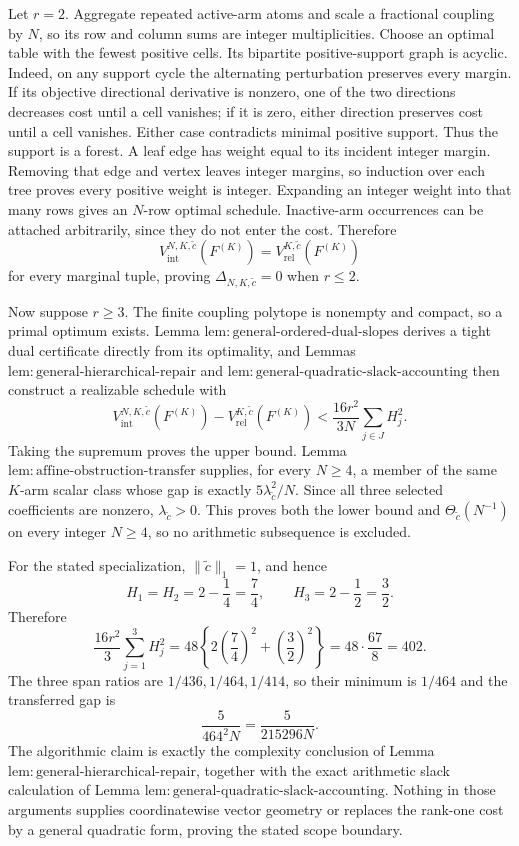 Let \(r=2\).  Aggregate repeated active-arm atoms and scale a fractional coupling by \(N\), so its row and column sums are integer multiplicities.  Choose an optimal table with the fewest positive cells.  Its bipartite positive-support graph is acyclic.  Indeed, on any support cycle the alternating perturbation preserves every margin.  If its objective directional derivative is nonzero, one of the two directions decreases cost until a cell vanishes; if it is zero, either direction preserves cost until a cell vanishes.  Either case contradicts minimal positive support.  Thus the support is a forest.  A leaf edge has weight equal to its incident integer margin.  Removing that edge and vertex leaves integer margins, so induction over each tree proves every positive weight is integer.  Expanding an integer weight into that many rows gives an \(N\)-row optimal schedule.  Inactive-arm occurrences can be attached arbitrarily, since they do not enter the cost.  Therefore
\[
 V_{\mathrm{int}}^{N,K,\widetilde c}(F^{(K)})
 =V_{\mathrm{rel}}^{K,\widetilde c}(F^{(K)})
\]
for every marginal tuple, proving \(\Delta_{N,K,\widetilde c}=0\) when \(r\le2\).

Now suppose \(r\ge3\).  The finite coupling polytope is nonempty and compact, so a primal optimum exists.  Lemma \(\mathrm{lem{:}general\mbox{-}ordered\mbox{-}dual\mbox{-}slopes}\) derives a tight dual certificate directly from its optimality, and Lemmas \(\mathrm{lem{:}general\mbox{-}hierarchical\mbox{-}repair}\) and \(\mathrm{lem{:}general\mbox{-}quadratic\mbox{-}slack\mbox{-}accounting}\) then construct a realizable schedule with
\[
 V_{\mathrm{int}}^{N,K,\widetilde c}(F^{(K)})-
 V_{\mathrm{rel}}^{K,\widetilde c}(F^{(K)})
 <\frac{16r^2}{3N}\sum_{j\in J}H_j^2. \tag{24}
\]
Taking the supremum proves the upper bound.  Lemma \(\mathrm{lem{:}affine\mbox{-}obstruction\mbox{-}transfer}\) supplies, for every \(N\ge4\), a member of the same \(K\)-arm scalar class whose gap is exactly \(5\lambda_{\widetilde c}^2/N\).  Since all three selected coefficients are nonzero, \(\lambda_{\widetilde c}>0\).  This proves both the lower bound and \(\Theta_{\widetilde c}(N^{-1})\) on every integer \(N\ge4\), so no arithmetic subsequence is excluded.

For the stated specialization, \(\|\widetilde c\|_1=1\), and hence
\[
 H_1=H_2=2-\frac14=\frac74,\qquad H_3=2-\frac12=\frac32.
\]
Therefore
\[
 \frac{16r^2}{3}\sum_{j=1}^3H_j^2
 =48\left\{2\left(\frac74\right)^2+\left(\frac32\right)^2\right\}
 =48\cdot\frac{67}{8}=402. \tag{25}
\]
The three span ratios are \(1/436,1/464,1/414\), so their minimum is \(1/464\) and the transferred gap is
\[
 \frac{5}{464^2N}=\frac{5}{215296N}. \tag{26}
\]
The algorithmic claim is exactly the complexity conclusion of Lemma \(\mathrm{lem{:}general\mbox{-}hierarchical\mbox{-}repair}\), together with the exact arithmetic slack calculation of Lemma \(\mathrm{lem{:}general\mbox{-}quadratic\mbox{-}slack\mbox{-}accounting}\).  Nothing in those arguments supplies coordinatewise vector geometry or replaces the rank-one cost by a general quadratic form, proving the stated scope boundary.

